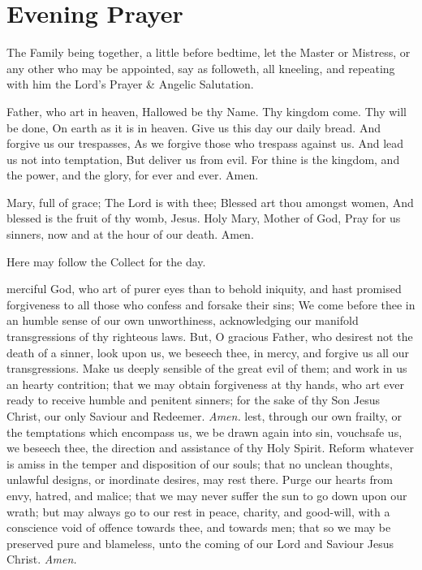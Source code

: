 \section*{Evening Prayer}
\vspace{-0.3\baselineskip}
\begin{secrubric}
    The Family being together, a little before bedtime, let the Master or Mistress, or any other who may be appointed, say as followeth, all kneeling, and repeating with him the Lord's Prayer \& Angelic Salutation.
\end{secrubric}
 Father, who art in heaven, Hallowed be thy Name. Thy kingdom come. Thy will be done, On earth as it is in heaven. Give us this day our daily bread. And forgive us our trespasses, As we forgive those who trespass against us. And lead us not into temptation, But deliver us from evil. For thine is the kingdom, and the power, and the glory, for ever and ever. Amen.\par
{}
 Mary, full of grace; The Lord is with thee; Blessed art thou amongst women, And blessed is the fruit of thy womb, Jesus. Holy Mary, Mother of God, Pray for us sinners, now and at the hour of our death. Amen.
\begin{rubric}
    Here may follow the Collect for the day.
\end{rubric}
 merciful God, who art of purer eyes than to behold iniquity, and hast promised forgiveness to all those who confess and forsake their sins; We come before thee in an humble sense of our own unworthiness, acknowledging our manifold transgressions of thy righteous laws. But, O gracious Father, who desirest not the death of a sinner, look upon us, we beseech thee, in mercy, and forgive us all our transgressions. Make us deeply sensible of the great evil of them; and work in us an hearty contrition; that we may obtain forgiveness at thy hands, who art ever ready to receive humble and penitent sinners; for the sake of thy Son Jesus Christ, our only Saviour and Redeemer. \textit{Amen.}
 lest, through our own frailty, or the temptations which encompass us, we be drawn again into sin, vouchsafe us, we beseech thee, the direction and assistance of thy Holy Spirit. Reform whatever is amiss in the temper and disposition of our souls; that no unclean thoughts, unlawful designs, or inordinate desires, may rest there. Purge our hearts from envy, hatred, and malice; that we may never suffer the sun to go down upon our wrath; but may always go to our rest in peace, charity, and good-will, with a conscience void of offence towards thee, and towards men; that so we may be preserved pure and blameless, unto the coming of our Lord and Saviour Jesus Christ. \textit{Amen.}
